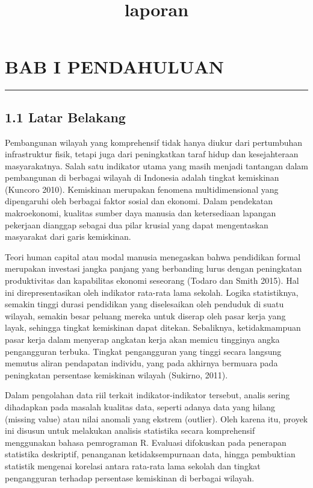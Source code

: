 \documentclass[
]{article}
\title{laporan}
\author{}
\date{\vspace{-2.5em}}
\begin{document}
\maketitle

\section{BAB I PENDAHULUAN}\label{bab-i-pendahuluan}

\begin{center}\rule{0.5\linewidth}{0.5pt}\end{center}

\subsection{1.1 Latar Belakang}\label{latar-belakang}

Pembangunan wilayah yang komprehensif tidak hanya diukur dari
pertumbuhan infrastruktur fisik, tetapi juga dari peningkatkan taraf
hidup dan kesejahteraan masyarakatnya. Salah satu indikator utama yang
masih menjadi tantangan dalam pembangunan di berbagai wilayah di
Indonesia adalah tingkat kemiskinan (Kuncoro 2010). Kemiskinan merupakan
fenomena multidimensional yang dipengaruhi oleh berbagai faktor sosial
dan ekonomi. Dalam pendekatan makroekonomi, kualitas sumber daya manusia
dan ketersediaan lapangan pekerjaan dianggap sebagai dua pilar krusial
yang dapat mengentaskan masyarakat dari garis kemiskinan.

Teori human capital atau modal manusia menegaskan bahwa pendidikan
formal merupakan investasi jangka panjang yang berbanding lurus dengan
peningkatan produktivitas dan kapabilitas ekonomi seseorang (Todaro dan
Smith 2015). Hal ini direpresentasikan oleh indikator rata-rata lama
sekolah. Logika statistiknya, semakin tinggi durasi pendidikan yang
diselesaikan oleh penduduk di suatu wilayah, semakin besar peluang
mereka untuk diserap oleh pasar kerja yang layak, sehingga tingkat
kemiskinan dapat ditekan. Sebaliknya, ketidakmampuan pasar kerja dalam
menyerap angkatan kerja akan memicu tingginya angka pengangguran
terbuka. Tingkat pengangguran yang tinggi secara langsung memutus aliran
pendapatan individu, yang pada akhirnya bermuara pada peningkatan
persentase kemiskinan wilayah (Sukirno, 2011).

Dalam pengolahan data riil terkait indikator-indikator tersebut, analis
sering dihadapkan pada masalah kualitas data, seperti adanya data yang
hilang (missing value) atau nilai anomali yang ekstrem (outlier). Oleh
karena itu, proyek ini disusun untuk melakukan analisis statistika
secara komprehensif menggunakan bahasa pemrograman R. Evaluasi
difokuskan pada penerapan statistika deskriptif, penanganan
ketidaksempurnaan data, hingga pembuktian statistik mengenai korelasi
antara rata-rata lama sekolah dan tingkat pengangguran terhadap
persentase kemiskinan di berbagai wilayah.
\end{document}
